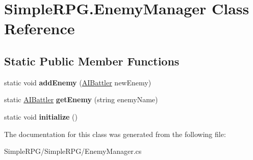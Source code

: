\hypertarget{class_simple_r_p_g_1_1_enemy_manager}{\section{Simple\-R\-P\-G.\-Enemy\-Manager Class Reference}
\label{class_simple_r_p_g_1_1_enemy_manager}
}
\subsection*{Static Public Member Functions}
\begin{DoxyCompactItemize}
\item 
\hypertarget{class_simple_r_p_g_1_1_enemy_manager_a089ea24ae14cceb9bc88b5a43731a139}{static void {\bfseries add\-Enemy} (\hyperlink{class_simple_r_p_g_1_1_a_i_battler}{A\-I\-Battler} new\-Enemy)}\label{class_simple_r_p_g_1_1_enemy_manager_a089ea24ae14cceb9bc88b5a43731a139}

\item 
\hypertarget{class_simple_r_p_g_1_1_enemy_manager_a56a02bddf70cd08f037d406c80b6f4b2}{static \hyperlink{class_simple_r_p_g_1_1_a_i_battler}{A\-I\-Battler} {\bfseries get\-Enemy} (string enemy\-Name)}\label{class_simple_r_p_g_1_1_enemy_manager_a56a02bddf70cd08f037d406c80b6f4b2}

\item 
\hypertarget{class_simple_r_p_g_1_1_enemy_manager_a398c5141a704ce9c65606465dca71700}{static void {\bfseries initialize} ()}\label{class_simple_r_p_g_1_1_enemy_manager_a398c5141a704ce9c65606465dca71700}

\end{DoxyCompactItemize}


The documentation for this class was generated from the following file\-:\begin{DoxyCompactItemize}
\item 
Simple\-R\-P\-G/\-Simple\-R\-P\-G/Enemy\-Manager.\-cs\end{DoxyCompactItemize}
